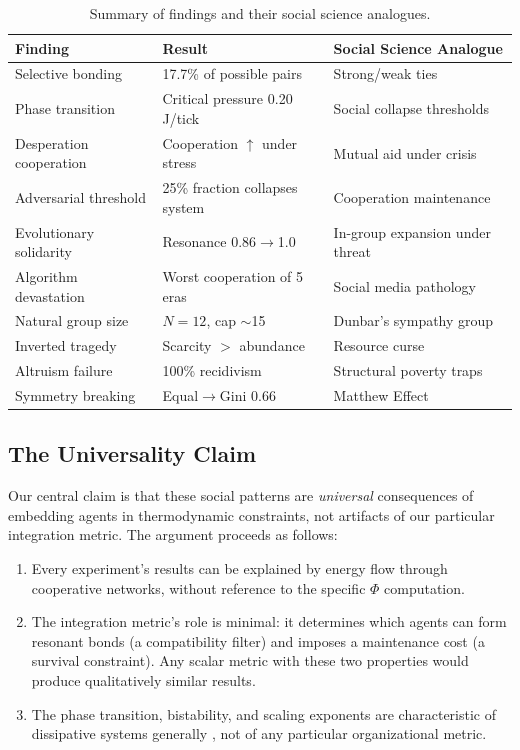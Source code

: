 \documentclass[12pt,a4paper]{article}
\begin{document}
\begin{table}[H]
\centering
\caption{Summary of findings and their social science analogues.}
\label{tab:summary}
\small
\begin{tabular}{@{}p{3.5cm}p{4.5cm}p{5cm}@{}}
\toprule
\textbf{Finding} & \textbf{Result} & \textbf{Social Science Analogue} \\
\midrule
Selective bonding & 17.7\% of possible pairs & Strong/weak ties \citep{granovetter1973} \\
Phase transition & Critical pressure 0.20 J/tick & Social collapse thresholds \\
Desperation cooperation & Cooperation $\uparrow$ under stress & Mutual aid under crisis \citep{kropotkin1902} \\
Adversarial threshold & 25\% fraction collapses system & Cooperation maintenance \citep{axelrod1984} \\
Evolutionary solidarity & Resonance 0.86$\to$1.0 & In-group expansion under threat \\
Algorithm devastation & Worst cooperation of 5 eras & Social media pathology \\
Natural group size & $N=12$, cap $\sim$15 & Dunbar's sympathy group \citep{dunbar2010} \\
Inverted tragedy & Scarcity $>$ abundance & Resource curse \citep{ross2015} \\
Altruism failure & 100\% recidivism & Structural poverty traps \citep{banerjee2011} \\
Symmetry breaking & Equal$\to$Gini 0.66 & Matthew Effect \citep{merton1968} \\
\bottomrule
\end{tabular}
\end{table}

\subsection{The Universality Claim}

Our central claim is that these social patterns are \emph{universal} consequences of embedding agents in thermodynamic constraints, not artifacts of our particular integration metric. The argument proceeds as follows:

\begin{enumerate}
\item Every experiment's results can be explained by energy flow through cooperative networks, without reference to the specific $\Phi$ computation.
\item The integration metric's role is minimal: it determines which agents can form resonant bonds (a compatibility filter) and imposes a maintenance cost (a survival constraint). Any scalar metric with these two properties would produce qualitatively similar results.
\item The phase transition, bistability, and scaling exponents are characteristic of dissipative systems generally \citep{prigogine1977}, not of any particular organizational metric.
\end{enumerate}
\end{document}
